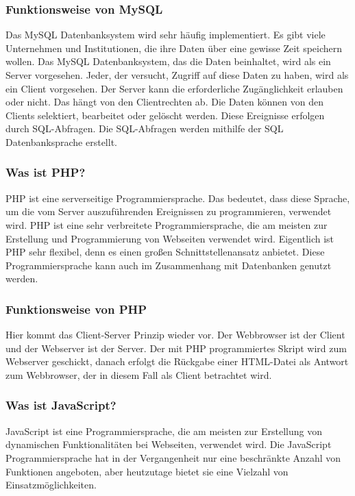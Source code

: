 \subsubsection{Funktionsweise von MySQL} 
Das MySQL Datenbanksystem wird sehr häufig implementiert. Es gibt viele Unternehmen und Institutionen, die ihre Daten über eine gewisse Zeit speichern wollen. Das MySQL Datenbanksystem, das die Daten beinhaltet, wird als ein Server vorgesehen. Jeder, der versucht, Zugriff auf diese Daten zu haben, wird als ein Client vorgesehen. Der Server kann die erforderliche Zugänglichkeit erlauben oder nicht. Das hängt von den Clientrechten ab. Die Daten können von den Clients selektiert, bearbeitet oder gelöscht werden. Diese Ereignisse erfolgen durch SQL-Abfragen. Die SQL-Abfragen werden mithilfe der SQL Datenbanksprache erstellt. 
\subsubsection{Was ist PHP?} 
PHP ist eine serverseitige Programmiersprache. Das bedeutet, dass diese Sprache, um 
die vom Server auszuführenden Ereignissen zu programmieren, verwendet wird. 
PHP ist eine sehr verbreitete Programmiersprache, die am meisten zur Erstellung und Programmierung von Webseiten verwendet wird. Eigentlich ist PHP sehr flexibel, denn es einen großen Schnittstellenansatz anbietet.  Diese Programmiersprache kann auch im Zusammenhang mit Datenbanken genutzt werden. 
\subsubsection{Funktionsweise von PHP} 
Hier kommt das Client-Server Prinzip wieder vor. Der Webbrowser ist der Client und der Webserver ist der Server. Der mit PHP programmiertes Skript wird zum Webserver geschickt, danach erfolgt die Rückgabe einer HTML-Datei als Antwort zum Webbrowser, der in diesem Fall als Client betrachtet wird.
\subsubsection{Was ist JavaScript?} 
JavaScript ist eine Programmiersprache, die am meisten zur Erstellung von dynamischen Funktionalitäten bei Webseiten, verwendet wird. Die JavaScript Programmiersprache hat in der Vergangenheit nur eine beschränkte Anzahl von Funktionen angeboten, aber heutzutage bietet sie eine Vielzahl von Einsatzmöglichkeiten. 

